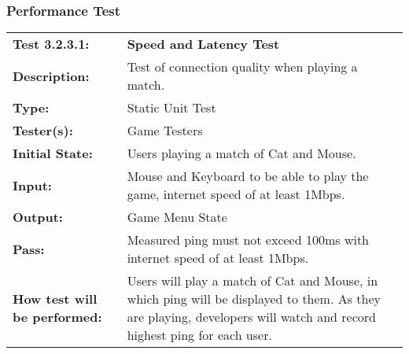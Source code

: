 \documentclass[12pt, titlepage]{article}
\begin{document}
\subsubsection{Performance Test}
\begin{mdframed}[linewidth=1pt]
\begin{tabularx}{\textwidth}{@{}p{3cm}X@{}}
{\bf Test 3.2.3.1:} & {\bf Speed and Latency Test}\\[\baselineskip]
{\bf Description:} & Test of connection quality when playing a match.\\[0.5\baselineskip]
{\bf Type:} & Static Unit Test\\[0.5\baselineskip]
{\bf Tester(s):} & Game Testers\\[0.5\baselineskip]
{\bf Initial State:} & Users playing a match of Cat and Mouse. \\[0.5\baselineskip]
{\bf Input:} & Mouse and Keyboard to be able to play the game, internet speed of at least 1Mbps.\\[0.5\baselineskip]
{\bf Output:} & Game Menu State\\[0.5\baselineskip]
{\bf Pass:} & Measured ping must not exceed 100ms with internet speed of at least 1Mbps.\\[0.5\baselineskip]
{\bf How test will be performed:} & Users will play a match of Cat and Mouse, in which ping will be displayed to them. As they are playing, developers will watch and record highest ping for each user. 
\end{tabularx}
\end{mdframed}
\end{document}
